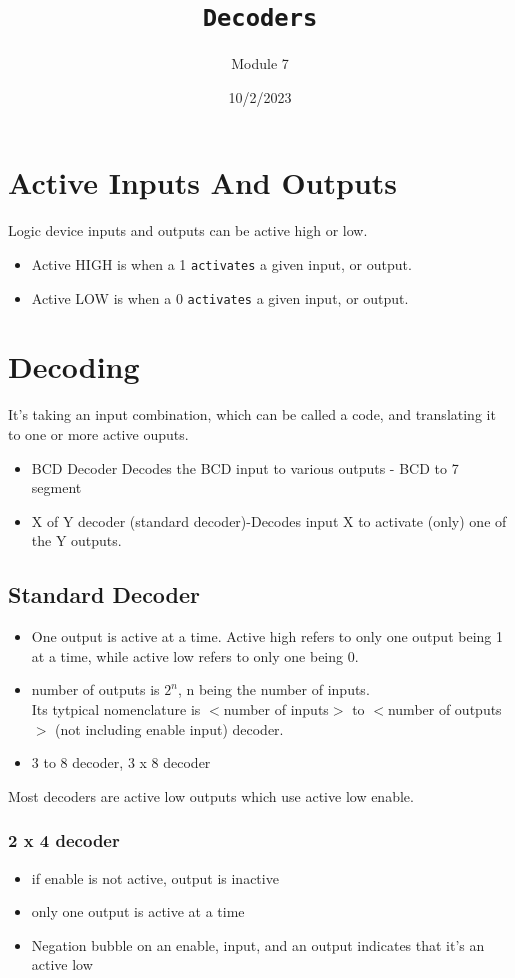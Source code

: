 \documentclass[a4paper,12pt]{article}
\title{\texttt{Decoders}\\\hrulefill}
\author{Module 7}
\date{\small{10/2/2023}}
\begin{document}
    \maketitle

    \section{Active Inputs And Outputs}
      Logic device inputs and outputs can be active high or low.
        \begin{itemize}
          \item Active HIGH is when a 1 \texttt{activates} a given input, or output.
          \item Active LOW is when a 0 \texttt{activates} a given input, or output.
        \end{itemize}
    
    \section{Decoding}
      It's taking an input combination, which can be called a code, and translating it to one or more active ouputs. 
      \begin{itemize}
        \item BCD Decoder Decodes the BCD input to various outputs - BCD to 7 segment
        \item X of Y decoder (standard decoder)-Decodes input X to activate (only) one of the Y outputs.
      \end{itemize}
      \subsection{Standard Decoder}
        \begin{itemize}
          \item One output is active at a time. Active high refers to only one output being 1 at a time, while active low refers to only one being 0.
          \item number of outputs is $2^n$, n being the number of inputs. \\
          Its tytpical nomenclature is $<$number of inputs$>$ to $<$number of outputs$>$ (not including enable input) decoder.
          \item 3 to 8 decoder, 3 x 8 decoder
        \end{itemize}
        Most decoders are active low outputs which use active low enable.

        \subsubsection{2 x 4 decoder}
          \begin{itemize}
            \item if enable is not active, output is inactive
            \item only one output is active at a time
            \item Negation bubble on an enable, input, and an output indicates that it's an active low
          \end{itemize}
\end{document}
